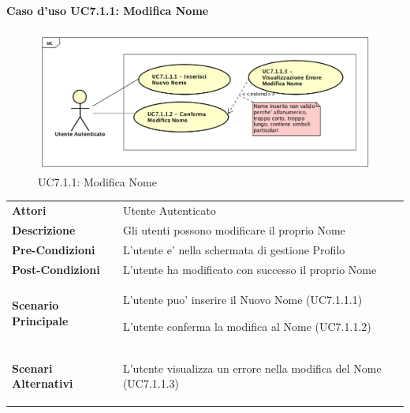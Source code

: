 \paragraph{Caso d'uso UC7.1.1:  Modifica Nome}
\label{UC7_1_1}
\begin{figure}[ht]
	\centering
	\includegraphics[scale=0.45]{UML/UC7_1_1.png}
	\caption{UC7.1.1:  Modifica Nome}
\end{figure}
\FloatBarrier
\begin{tabular}{ l | p{11cm}}
	\hline
	\rowcolor{Gray}
	 \multicolumn{2}{c}{UC7.1.1 - Modifica Nome} \\
	 \hline
	\textbf{Attori} & Utente Autenticato \\
	\textbf{Descrizione} & Gli utenti possono modificare il proprio Nome\\
	\textbf{Pre-Condizioni} & L'utente e' nella schermata di gestione Profilo\\
	\textbf{Post-Condizioni} & L'utente ha modificato con successo il proprio Nome \\
	\textbf{Scenario Principale} & 
	\begin{enumerate*}[label=(\arabic*.),itemjoin={\newline}]
		\item L'utente puo' inserire il Nuovo Nome (UC7.1.1.1)
		\item L'utente conferma la modifica al Nome (UC7.1.1.2)
	\end{enumerate*}\\
	\textbf{Scenari Alternativi} & 
	\begin{enumerate*}[label=(\arabic*.),itemjoin={\newline}]
		\item L'utente visualizza un errore nella modifica del Nome (UC7.1.1.3)
	\end{enumerate*}\\
\end{tabular}
